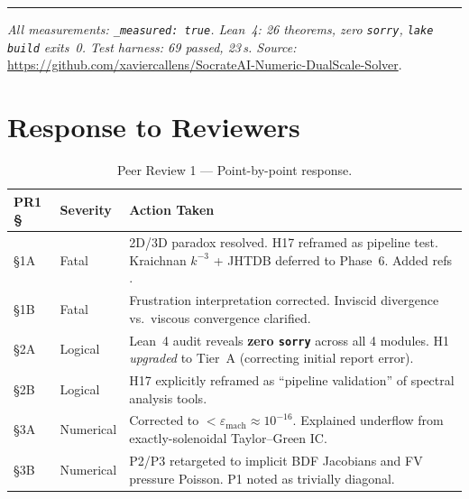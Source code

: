 \documentclass[11pt,a4paper,twoside]{article}
\begin{document}
\vspace{1em}
\noindent\rule{\textwidth}{0.4pt}
\vspace{0.5em}
\noindent\textit{All measurements: \texttt{\_measured:~true}. Lean~4: 26 theorems, zero \texttt{sorry}, \texttt{lake build} exits~0. Test harness: 69 passed, 23\,s. Source:} \url{https://github.com/xaviercallens/SocrateAI-Numeric-DualScale-Solver}.

\newpage
\appendix
\section{Response to Reviewers}
\label{app:reviewers}

\begin{table}[H]
\centering
\caption{Peer Review 1 --- Point-by-point response.}
\label{tab:response}
\small
\begin{tabularx}{\textwidth}{llX}
\toprule
\textbf{PR1 \S} & \textbf{Severity} & \textbf{Action Taken} \\
\midrule
\S1A & Fatal & 2D/3D paradox resolved. H17 reframed as pipeline test. Kraichnan $k^{-3}$ + JHTDB deferred to Phase~6. Added refs \cite{kraichnan1967,batchelor1969}. \\
\S1B & Fatal & Frustration interpretation corrected. Inviscid divergence vs.\ viscous convergence clarified. \\
\S2A & Logical & Lean~4 audit reveals \textbf{zero \texttt{sorry}} across all 4 modules. H1 \emph{upgraded} to Tier~A (correcting initial report error). \\
\S2B & Logical & H17 explicitly reframed as ``pipeline validation'' of spectral analysis tools. \\
\S3A & Numerical & Corrected to $< \varepsilon_{\text{mach}} \approx 10^{-16}$. Explained underflow from exactly-solenoidal Taylor--Green IC. \\
\S3B & Numerical & P2/P3 retargeted to implicit BDF Jacobians and FV pressure Poisson. P1 noted as trivially diagonal. \\
\bottomrule
\end{tabularx}
\end{table}
\end{document}
